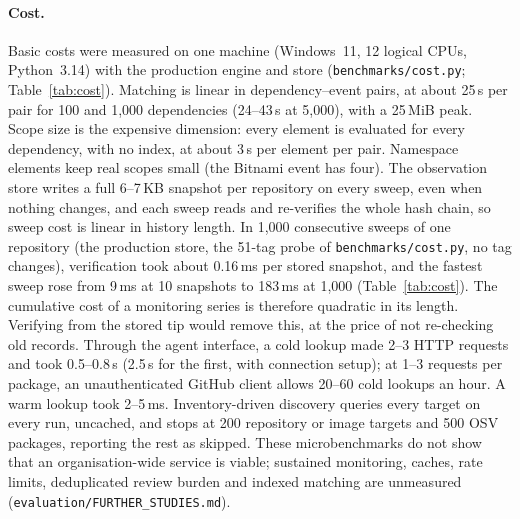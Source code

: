 \documentclass[11pt,a4paper]{article}
\newcommand{\code}[1]{\texttt{#1}}
\begin{document}
\paragraph{Cost.}\label{sec:cost} Basic costs were measured on
one machine (Windows~11, 12 logical CPUs, Python~3.14) with
the production engine and store (\code{benchmarks/cost.py};
Table~\ref{tab:cost}). Matching is linear in dependency--event pairs,
at about 25\,\textmu{}s per pair for 100 and 1{,}000 dependencies
(24--43\,\textmu{}s at 5{,}000), with a 25\,MiB peak.
Scope size is the expensive dimension: every element is evaluated for
every dependency, with no index, at about 3\,\textmu{}s per element
per pair. Namespace elements keep real scopes small (the Bitnami event
has four). The observation store writes a full 6--7\,KB snapshot per
repository on every sweep, even when nothing changes, and each sweep
reads and re-verifies the whole hash chain, so sweep cost is linear in
history length. In 1{,}000 consecutive sweeps of one repository (the
production store, the 51-tag probe of \code{benchmarks/cost.py}, no
tag changes), verification took about 0.16\,ms per stored snapshot,
and the fastest sweep rose from 9\,ms at 10 snapshots to 183\,ms at
1{,}000 (Table~\ref{tab:cost}). The cumulative
cost of a monitoring series is therefore quadratic in its length.
Verifying from the stored tip would remove this, at the price of not
re-checking old records. Through the agent interface, a cold lookup
made 2--3 HTTP requests and took 0.5--0.8\,s (2.5\,s for the first,
with connection setup); at 1--3 requests per package, an
unauthenticated GitHub client allows 20--60 cold lookups an hour. A
warm lookup took 2--5\,ms.
Inventory-driven discovery queries every target on every
run, uncached, and stops at 200 repository or image targets and 500
OSV packages, reporting the rest as skipped. These microbenchmarks do
not show that an organisation-wide service is viable; sustained
monitoring, caches, rate limits, deduplicated review burden and
indexed matching are unmeasured
(\code{evaluation/FURTHER\_STUDIES.md}).
\end{document}
